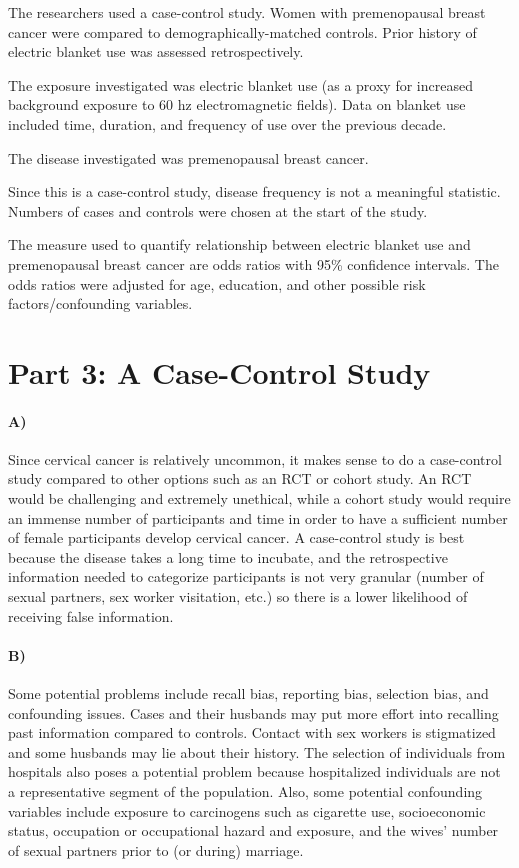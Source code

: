 \documentclass[
]{article}
\begin{document}
The researchers used a case-control study. Women with premenopausal
breast cancer were compared to demographically-matched controls. Prior
history of electric blanket use was assessed retrospectively.

The exposure investigated was electric blanket use (as a proxy for
increased background exposure to 60 hz electromagnetic fields). Data on
blanket use included time, duration, and frequency of use over the
previous decade.

The disease investigated was premenopausal breast cancer.

Since this is a case-control study, disease frequency is not a
meaningful statistic. Numbers of cases and controls were chosen at the
start of the study.

The measure used to quantify relationship between electric blanket use
and premenopausal breast cancer are odds ratios with 95\% confidence
intervals. The odds ratios were adjusted for age, education, and other
possible risk factors/confounding variables.

\pagebreak

\section{Part 3: A Case-Control
Study}\label{part-3-a-case-control-study}

\paragraph{A)}\label{a-1}

Since cervical cancer is relatively uncommon, it makes sense to do a
case-control study compared to other options such as an RCT or cohort
study. An RCT would be challenging and extremely unethical, while a
cohort study would require an immense number of participants and time in
order to have a sufficient number of female participants develop
cervical cancer. A case-control study is best because the disease takes
a long time to incubate, and the retrospective information needed to
categorize participants is not very granular (number of sexual partners,
sex worker visitation, etc.) so there is a lower likelihood of receiving
false information.

\paragraph{B)}\label{b-1}

Some potential problems include recall bias, reporting bias, selection
bias, and confounding issues. Cases and their husbands may put more
effort into recalling past information compared to controls. Contact
with sex workers is stigmatized and some husbands may lie about their
history. The selection of individuals from hospitals also poses a
potential problem because hospitalized individuals are not a
representative segment of the population. Also, some potential
confounding variables include exposure to carcinogens such as cigarette
use, socioeconomic status, occupation or occupational hazard and
exposure, and the wives' number of sexual partners prior to (or during)
marriage.
\end{document}
